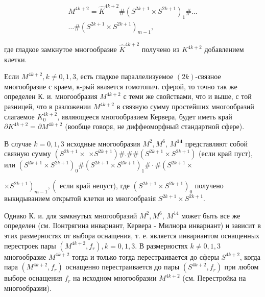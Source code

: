 \documentclass[10pt]{article}
\begin{document}
\[

\begin{gathered}

M^{4 k+2}=\hat{K}^{4 k+2} \#\left(S^{2 k+1} \times S^{2 k+1}\right)_{1} \# \ldots \\

\ldots \#\left(S^{2 k+1} \times S^{2 k+1}\right)_{m-1},

\end{gathered}

\]



где гладкое замкнутое многообразие $\widehat{K}^{4 k+2}$ получено из $K^{4 k+2}$ добавлением клетки.



Если $M^{4 k+2}, k \neq 0,1,3$, есть гладкое параллелизуемое $(2 k)$-связное многообразие с краем, к-рый является гомотопич. сферой, то точно так же определен К. и. многообразия $M^{4 k+2}$ с теми же свойствами, что и выше, с той разницей, что в разложении $M^{4 k+2}$ в связную сумму простейших многообразий слагаемое $K_{0}^{4 k+2}$, являющееся многообразием Кервера, будет иметь край $\partial K^{4 k+2}=\partial M^{4 k+2}$ (вообще говоря, не диффеоморфный стандартной сфере).



В случае $k=0,1,3$ исходные многообразия $M^{2}, M^{6}$, $M^{\mathbf{1 4}}$ представляют собой связную сумму $\left(S^{2 k+1} \times\right.$ $\left.\times S^{2 k+1}\right) \# . \# \#\left(S^{2 k+1} \times S^{2 k+1}\right)$ (если край пуст), или $\left(S^{2 k+1} \times S^{2 k+1}\right)_{0} \#\left(S^{2 k+1} \times S^{2 k+1}\right)_{1} \# \cdot \#\left(S^{2 k+1} \times\right.$

$\left.\times S^{2 k+1}\right)_{m-1},\left(\right.$ если край непуст), где $\left(S^{2 k+1} \times S^{2 k+1}\right)_{0}$ получено выкидыванием открытой клетки из многообразія $S^{2 k+1} \times S^{2 k+1}$.



Однако К. и. для замкнутых многообразий $M^{2}, M^{6}$, $M^{14}$ может быть все же определен (см. Ilонтрягина инвариант, Кервера - Милнора инвариант) и зависит в этих размерностях от выбора оснащения, т. е. является инвариантом оснащенных перестроек пары $\left(M^{4 k+2}, f_{r}\right), k=0,1,3$. В размерностях $k \neq 0,1,3$ многообразие $M^{4 k+2}$ тогда и только тогда перестраивается до сферы $S^{4 k+2}$, когда пара $\left(M^{4 k+2}, f_{r}\right)$ оснащенно перестраивается до пары $\left(S^{4 k+2}, f_{r}\right)$ при любом выборе оснащения $f_{r}$ на исходном многообразии $M^{4 k+2}$ (см. Перестройка на многообразии).
\end{document}
